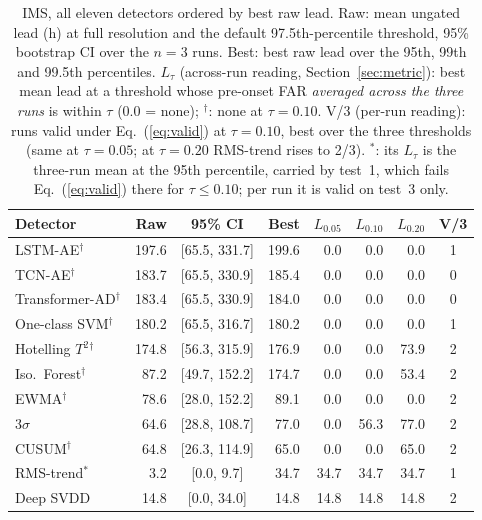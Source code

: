 \begin{table}[t] \footnotesize
	\begin{center}
	\caption{IMS, all eleven detectors ordered by best raw lead. Raw: mean ungated lead (h) at full resolution and the default 97.5th-percentile threshold, 95\% bootstrap CI over the $n=3$ runs. Best: best raw lead over the 95th, 99th and 99.5th percentiles. $L_\tau$ (across-run reading, Section~\ref{sec:metric}): best mean lead at a threshold whose pre-onset FAR \emph{averaged across the three runs} is within $\tau$ (0.0 = none); $^\dagger$: none at $\tau=0.10$. V/3 (per-run reading): runs valid under Eq.~(\ref{eq:valid}) at $\tau=0.10$, best over the three thresholds (same at $\tau=0.05$; at $\tau=0.20$ RMS-trend rises to 2/3). $^\ast$: its $L_\tau$ is the three-run mean at the 95th percentile, carried by test~1, which fails Eq.~(\ref{eq:valid}) there for $\tau \le 0.10$; per run it is valid on test~3 only.}
	\label{tab:imsdet}
	\setlength{\tabcolsep}{2pt}
	\begin{tabular}{l r c r r r r c}
		\hline \hline
		\textbf{Detector} & \textbf{Raw} & \textbf{95\% CI} & \textbf{Best} & $L_{0.05}$ & $L_{0.10}$ & $L_{0.20}$ & \textbf{V/3} \\
		\hline
		LSTM-AE$^\dagger$ & 197.6 & [65.5, 331.7] & 199.6 & 0.0 & 0.0 & 0.0 & 1 \\
		TCN-AE$^\dagger$ & 183.7 & [65.5, 330.9] & 185.4 & 0.0 & 0.0 & 0.0 & 0 \\
		Transformer-AD$^\dagger$ & 183.4 & [65.5, 330.9] & 184.0 & 0.0 & 0.0 & 0.0 & 0 \\
		One-class SVM$^\dagger$ & 180.2 & [65.5, 316.7] & 180.2 & 0.0 & 0.0 & 0.0 & 1 \\
		Hotelling $T^2$$^\dagger$ & 174.8 & [56.3, 315.9] & 176.9 & 0.0 & 0.0 & 73.9 & 2 \\
		Iso.\ Forest$^\dagger$ & 87.2 & [49.7, 152.2] & 174.7 & 0.0 & 0.0 & 53.4 & 2 \\
		EWMA$^\dagger$ & 78.6 & [28.0, 152.2] & 89.1 & 0.0 & 0.0 & 0.0 & 2 \\
		$3\sigma$ & 64.6 & [28.8, 108.7] & 77.0 & 0.0 & 56.3 & 77.0 & 2 \\
		CUSUM$^\dagger$ & 64.8 & [26.3, 114.9] & 65.0 & 0.0 & 0.0 & 65.0 & 2 \\
		RMS-trend$^\ast$ & 3.2 & [0.0, 9.7] & 34.7 & 34.7 & 34.7 & 34.7 & 1 \\
		Deep SVDD & 14.8 & [0.0, 34.0] & 14.8 & 14.8 & 14.8 & 14.8 & 2 \\
		\hline \hline
	\end{tabular}
	\end{center}
\end{table}
